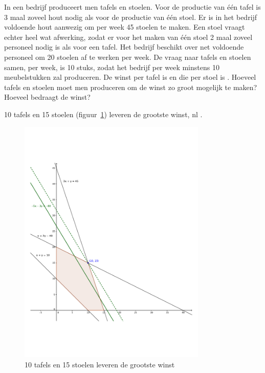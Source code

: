      
\begin{oef}
In een bedrijf produceert men tafels en stoelen. Voor de
     productie van \'{e}\'{e}n tafel is 3 maal zoveel hout nodig als
     voor de productie van \'e\'en stoel. Er is in het bedrijf voldoende
     hout aanwezig om per week 45 stoelen te maken. Een stoel vraagt echter
     heel wat afwerking, zodat er voor het maken van \'{e}\'{e}n
     stoel 2 maal zoveel personeel nodig is als voor een tafel. Het
     bedrijf beschikt over net voldoende personeel om 20 stoelen af te
     werken per week. De vraag naar tafels en stoelen samen, per week,
     is 10 stuks, zodat het bedrijf per week minstens 10 meubelstukken zal produceren. De winst per tafel is  en die per stoel is
     . Hoeveel tafels en stoelen moet men produceren om de
        winst zo groot mogelijk te maken? Hoeveel bedraagt de winst?
        \begin{opl}
        10 tafels en 15 stoelen (figuur~\ref{fig:tafelstoelen}) leveren de grootste winst, nl .
        \begin{figure}[hbtp]
\centering
\includegraphics[width=0.8\textwidth]{oefeningen/FigurenLP/Oef7.pdf}
\caption{10 tafels en 15 stoelen leveren de grootste winst}
\label{fig:tafelstoelen}
\end{figure}
\clearpage
        \end{opl}
\end{oef}

